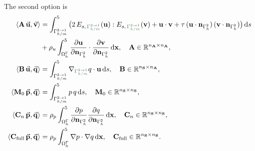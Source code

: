 \documentclass[12pt]{article}
\newcommand{\vect}[1]{\boldsymbol{\mathbf{#1}}}
\newcommand*\diff{\mathop{}\!\mathrm{d}}
\begin{document}
The second option is
\begin{align}\begin{split}\label{mtx_exact_2}
	\langle \vect A\,\vec{\vect u}, \vec{\vect v} \rangle &= 
		\int^5_{\Gamma_{h/m}^{2 \to 1}} \big( 2\,E_{s,\,\textcolor{DarkGreen}{\Gamma_{h/m}^{2 \to 1}}}(\vect u) : E_{s,\,\textcolor{DarkGreen}{\Gamma_{h/m}^{2 \to 1}}}(\vect v) + \vect u\cdot\vect v + \tau\,(\vect u\cdot\vect n_{\Gamma_{h}^2})\,(\vect v\cdot\vect n_{\Gamma_{h}^2}) \big) \diff{s} \\
	&
		+ \rho_u \int^5_{\Omega_h^{\Gamma}} \frac{\partial \vect u}{\partial\vect n_{\Gamma_{h}^2}}\cdot\frac{\partial \vect v}{\partial\vect n_{\Gamma_{h}^2}} \diff{\vect x}, \quad \vect A \in \mathbb R^{n_{\vect A} \times n_{\vect A}},\\
	\langle \vect B\,\vec{\vect u}, \vec{\vect q} \rangle &= 
		\int^5_{\Gamma_{h/m}^{2 \to 1}} \nabla_{\textcolor{DarkGreen}{\Gamma_{h/m}^{2 \to 1}}} q \cdot \vect u \diff{s}, \quad \vect B \in \mathbb R^{n_{\vect S} \times n_{\vect A}},\\
	\langle \vect M_0\,\vec{\vect p}, \vec{\vect q} \rangle &=
		\int^5_{\Gamma_{h/m}^{2 \to 1}} p\,q \diff{s}, \quad \vect M_0 \in \mathbb R^{n_{\vect S} \times n_{\vect S}},\\
	\langle \vect C_n\,\vec{\vect p}, \vec{\vect q} \rangle &=
		\rho_p \int^5_{\Omega^{\Gamma}_h} \frac{\partial p}{\partial\vect n_{\Gamma_{h}^2}} \frac{\partial q}{\partial\vect n_{\Gamma_{h}^2}} \diff{\vect x}, \quad \vect C_n \in \mathbb R^{n_{\vect S} \times n_{\vect S}},\\
	\langle \vect C_{\text{full}}\,\vec{\vect p}, \vec{\vect q} \rangle &=
		\rho_p \int^5_{\Omega^{\Gamma}_h} \nabla p \cdot \nabla q \diff{\vect x}, \quad \vect C_{\text{full}} \in \mathbb R^{n_{\vect S} \times n_{\vect S}}.
\end{split}\end{align}
\end{document}
